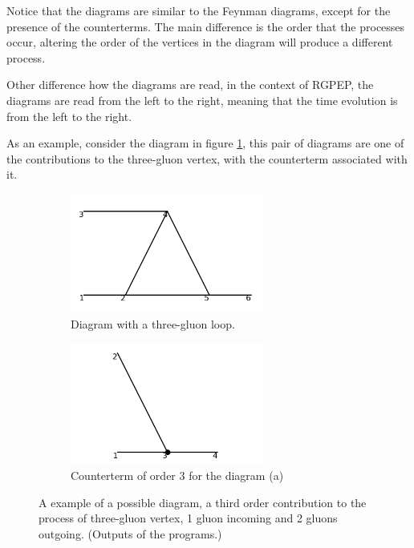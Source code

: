 \documentclass[11pt,a4paper,twoside,pdf]{article}
\numberwithin{equation}{section}
\begin{document}
Notice that the diagrams are similar to the Feynman diagrams\cite{Peskin:1995ev}, except for the presence
of the counterterms. The main difference is the order that the processes occur, altering
the order of the vertices in the diagram will produce a different process. 

Other difference how the diagrams are read, in the context of RGPEP, the diagrams are
read from the left to the right, meaning that the time evolution is from the left to 
the right.

As an example, consider the diagram in figure \ref{fig:example_diagram}, this pair of 
diagrams are one of the contributions to the three-gluon vertex, with the counterterm 
associated with it. 

\begin{figure}[h!]
    \centering
    \begin{subfigure}[t]{0.5\textwidth}
        \centering
        \includegraphics[width=0.7\textwidth]{plots/order3/order3_1to2/1.png}
        \caption{Diagram with a three-gluon loop.}
    \end{subfigure}%
    \begin{subfigure}[t]{0.5\textwidth}
        \centering
        \includegraphics[width=0.7\textwidth]{plots/order3/order3_1to2/counterterms/1.png}
        \caption{Counterterm of order 3 for the diagram (a)}
    \end{subfigure}
    \caption{A example of a possible diagram, a third order contribution to the 
    process of three-gluon vertex, 1 gluon incoming and 2 gluons outgoing. (Outputs of 
    the programs.)}
    \label{fig:example_diagram}
\end{figure}
\end{document}
